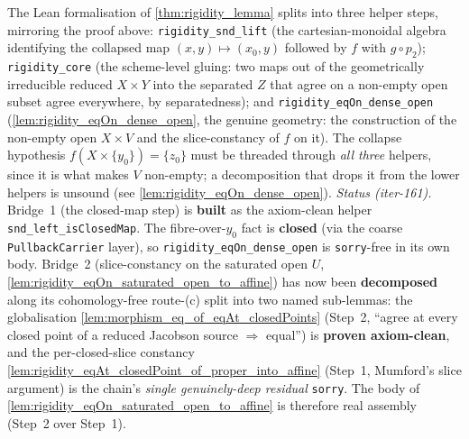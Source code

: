 \begin{remark}
  \label{rmk:rigidity_lemma_decomposition}
  The Lean formalisation of \cref{thm:rigidity_lemma} splits into three helper steps, mirroring
  the proof above: \texttt{rigidity\_snd\_lift} (the cartesian-monoidal algebra identifying the
  collapsed map \((x, y) \mapsto (x_0, y)\) followed by \(f\) with \(g \circ p_2\));
  \texttt{rigidity\_core} (the scheme-level gluing: two maps out of the geometrically irreducible
  reduced \(X \times Y\) into the separated \(Z\) that agree on a non-empty open subset agree
  everywhere, by separatedness); and \texttt{rigidity\_eqOn\_dense\_open}
  (\cref{lem:rigidity_eqOn_dense_open}, the genuine geometry: the construction of the non-empty
  open \(X \times V\) and the slice-constancy of \(f\) on it). The collapse hypothesis
  \(f(X \times \{y_0\}) = \{z_0\}\) must be threaded through \emph{all three} helpers, since it is
  what makes \(V\) non-empty; a decomposition that drops it from the lower helpers is unsound
  (see \cref{lem:rigidity_eqOn_dense_open}).
  \emph{Status (iter-161).} Bridge~1 (the closed-map step) is \textbf{built} as the axiom-clean
  helper \texttt{snd\_left\_isClosedMap}. The fibre-over-\(y_0\) fact is \textbf{closed} (via the
  coarse \texttt{PullbackCarrier} layer), so \texttt{rigidity\_eqOn\_dense\_open} is
  \texttt{sorry}-free in its own body. Bridge~2 (slice-constancy on the saturated open \(U\),
  \cref{lem:rigidity_eqOn_saturated_open_to_affine}) has now been \textbf{decomposed} along its
  cohomology-free route-(c) split into two named sub-lemmas: the globalisation
  \cref{lem:morphism_eq_of_eqAt_closedPoints} (Step~2, ``agree at every closed point of a reduced
  Jacobson source \(\Rightarrow\) equal'') is \textbf{proven axiom-clean}, and the per-closed-slice
  constancy \cref{lem:rigidity_eqAt_closedPoint_of_proper_into_affine} (Step~1, Mumford's slice
  argument) is the chain's \emph{single genuinely-deep residual} \texttt{sorry}. The body of
  \cref{lem:rigidity_eqOn_saturated_open_to_affine} is therefore real assembly (Step~2 over Step~1).

\end{remark}
